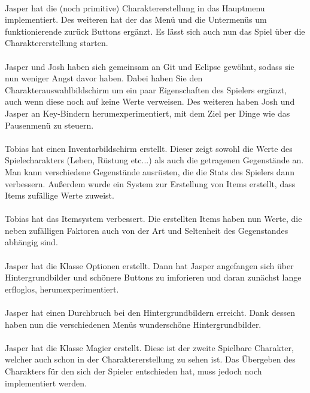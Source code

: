          \\
            Jasper hat die (noch primitive) Charaktererstellung in das Hauptmenu implementiert. Des weiteren hat der das Menü und die Untermenüs um funktionierende zurück Buttons ergänzt. Es lässt sich auch nun das Spiel über die Charaktererstellung starten.\\
           
         \\
            Jasper und Josh haben sich gemeinsam an Git und Eclipse gewöhnt, sodass sie nun weniger Angst davor haben. Dabei haben Sie den Charakterauswahlbildschirm um ein paar Eigenschaften des Spielers ergänzt, auch wenn diese noch auf keine Werte verweisen. Des weiteren haben Josh und Jasper an Key-Bindern herumexperimentiert, mit dem Ziel per Dinge wie das Pausenmenü zu steuern.\\
           
         \\
            Tobias hat einen Inventarbildschirm erstellt.
            Dieser zeigt sowohl die Werte des Spielecharakters (Leben, Rüstung etc...) als auch die getragenen Gegenstände an.
            Man kann verschiedene Gegenstände ausrüsten, die die Stats des Spielers dann verbessern.
            Außerdem wurde ein System zur Erstellung von Items erstellt, dass Items zufällige Werte zuweist.\\

             \\
            Tobias hat das Itemsystem verbessert.
            Die erstellten Items haben nun Werte, die neben zufälligen Faktoren auch von der Art und Seltenheit des Gegenstandes abhängig sind.\\

         \\
           Jasper hat die Klasse Optionen erstellt. Dann hat Jasper angefangen sich über Hintergrundbilder und schönere Buttons zu imforieren und daran zunächst lange erfloglos, herumexperimentiert.\\
           
         \\
            Jasper hat einen Durchbruch bei den Hintergrundbildern erreicht. Dank dessen haben nun die verschiedenen Menüs wunderschöne Hintergrundbilder.\\
            
         \\
           Jasper hat die Klasse Magier erstellt. Diese ist der zweite Spielbare Charakter, welcher auch schon in der Charaktererstellung zu sehen ist. Das Übergeben des Charakters für den sich der Spieler entschieden hat, muss jedoch noch implementiert werden.\\
           

